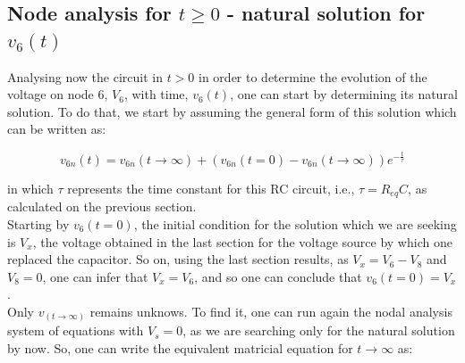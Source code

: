 \subsection{Node analysis for $t\geq0$ - natural solution for $v_6(t)$}
Analysing now the circuit in $t>0$ in order to determine the evolution of the voltage on node 6, $V_6$, with time, $v_6(t)$, one can start by determining its natural solution. To do that, we start by assuming the general form of this solution which can be written as:

\begin{equation}
    v_{6n}(t) = v_{6n} (t\to\infty) + (v_{6n}(t = 0) - v_{6n}(t\to\infty))e^{-\frac{t}{\tau}}
\label{generalfor}
\end{equation}

in which $\tau$ represents the time constant for this RC circuit, i.e., $\tau = R_{eq}C$, as calculated on the previous section.\\

Starting by $v_6 (t=0)$, the initial condition for the solution which we are seeking is $V_x$, the voltage obtained in the last section for the voltage source by which one replaced the capacitor. So on, using the last section results, as $V_x = V_6 - V_8$ and $V_8 = 0$, one can infer that $V_x = V_6$, and so one can conclude that $v_6(t=0) = V_x$. \\

Only $v_(t\to\infty)$ remains unknows. To find it, one can run again the nodal analysis system of equations with $V_s = 0$, as we are searching only for the natural solution by now. So, one can write the equivalent matricial equation for $t\to\infty$ as:


